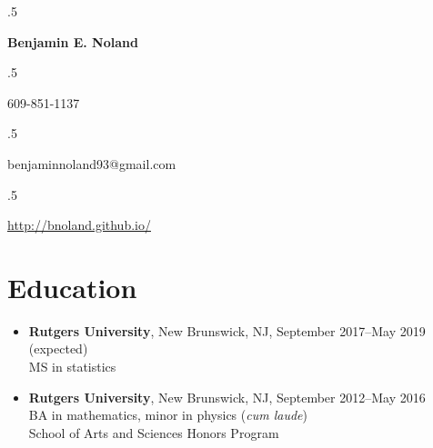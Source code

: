 \documentclass[letterpaper,12pt]{article}
\begin{document}
\moveleft.5\hoffset\centerline{\Large\bf Benjamin E. Noland}
\smallskip
\moveleft.5\hoffset\centerline{609-851-1137}
\moveleft.5\hoffset\centerline{benjaminnoland93@gmail.com}
\moveleft.5\hoffset\centerline{\url{http://bnoland.github.io/}}

\section*{Education}

\begin{itemize}
\item \textbf{Rutgers University}, New Brunswick, NJ, September
  2017--May 2019 (expected) \\
  MS in statistics

\item \textbf{Rutgers University}, New Brunswick, NJ, September
  2012--May 2016 \\
  BA in mathematics, minor in physics (\textit{cum laude}) \\
  School of Arts and Sciences Honors Program
\end{itemize}

\iffalse
\subsection*{Selection of coursework:}
\begin{itemize}
\item \textbf{Mathematics:} Calculus, linear algebra, ordinary
  differential equations, real analysis, complex variables,
  differential geometry, linear programming, abstract algebra,
  topology \textit{(taken at Rutgers University)}

\item \textbf{Physics:} Classical mechanics, electromagnetism,
  astrophysics \textit{(taken at Rutgers University)}

\item \textbf{Computer science:} Systems programming, data structures
  and algorithms \textit{(taken at Princeton University while in high
    school)}; Advanced Placement computer science \textit{(taken in
    high school)}

\item \textbf{Statistics:} Advanced Placement statistics
  \textit{(taken in high school)}, probability theory, regression
  analysis \textit{(taking at Rutgers University)}

\end{itemize}
\fi
\end{document}
